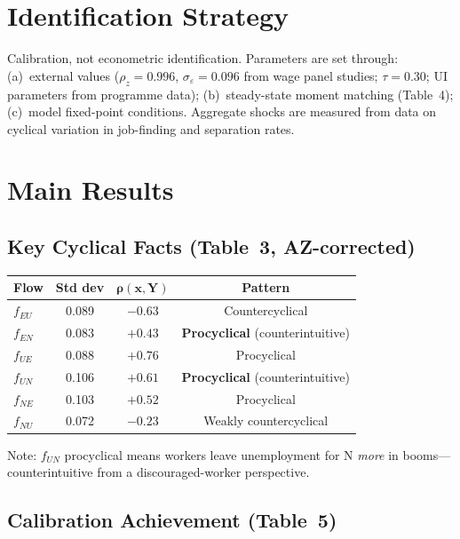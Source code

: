 \section{Identification Strategy}

Calibration, not econometric identification. Parameters are set through:
(a)~external values ($\rho_z=0.996$, $\sigma_\varepsilon=0.096$ from wage
panel studies; $\tau=0.30$; UI parameters from programme data);
(b)~steady-state moment matching (Table~4); (c)~model fixed-point conditions.
Aggregate shocks are measured from data on cyclical variation in job-finding
and separation rates.

\section{Main Results}

\subsection*{Key Cyclical Facts (Table~3, AZ-corrected)}

\begin{center}
\begin{tabular}{lccc}
\toprule
\textbf{Flow} & \textbf{Std dev} & $\boldsymbol{\rho(x,Y)}$ &
  \textbf{Pattern} \\
\midrule
$f_{EU}$ & 0.089 & $-0.63$ & Countercyclical \\
$f_{EN}$ & 0.083 & $+0.43$ & \textbf{Procyclical} (counterintuitive) \\
$f_{UE}$ & 0.088 & $+0.76$ & Procyclical \\
$f_{UN}$ & 0.106 & $+0.61$ & \textbf{Procyclical} (counterintuitive) \\
$f_{NE}$ & 0.103 & $+0.52$ & Procyclical \\
$f_{NU}$ & 0.072 & $-0.23$ & Weakly countercyclical \\
\bottomrule
\end{tabular}
\end{center}

Note: $f_{UN}$ procyclical means workers leave unemployment for N
\emph{more} in booms---counterintuitive from a discouraged-worker perspective.

\subsection*{Calibration Achievement (Table~5)}

